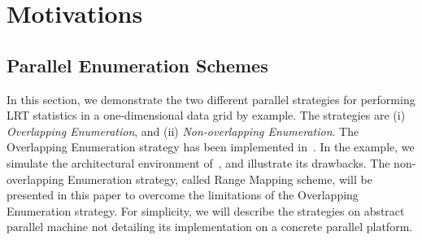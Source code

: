 \documentclass[AMA,LATO1COL]{WileyNJD-v2}
\begin{document}
\section{Motivations}
\label{sec:mov}

\subsection{Parallel Enumeration Schemes}
\label{sec:mov1}

In this section, we demonstrate the two different parallel strategies for performing LRT statistics in a one-dimensional data grid by example. The strategies are (i) \emph{Overlapping Enumeration}, and (ii) \emph{Non-overlapping Enumeration}. The Overlapping Enumeration strategy has been implemented in~\cite{apweb}. In the example, we simulate the architectural environment of~\cite{apweb}, and illustrate its drawbacks. The non-overlapping Enumeration strategy, called Range Mapping scheme, will be presented in this paper to overcome the limitations of the Overlapping Enumeration strategy. For simplicity, we will describe the strategies on abstract parallel machine not detailing its implementation on a concrete parallel platform. \\

\end{document}
